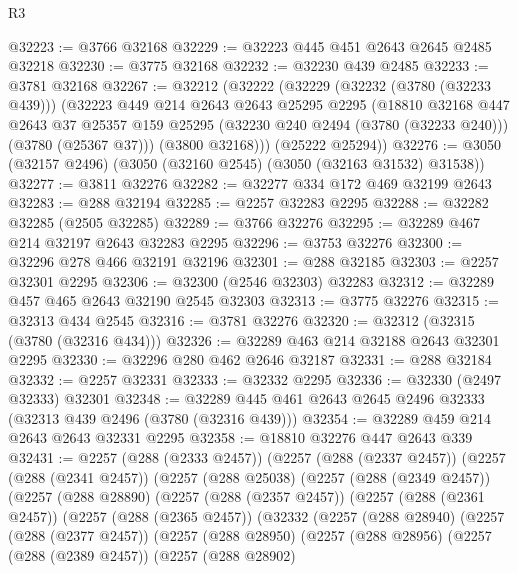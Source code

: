 \begin{lexlean}{R3}
\begin{coremodule}
@32223 := @3766 @32168
@32229 := @32223 @445 @451 @2643 @2645 @2485 @32218
@32230 := @3775 @32168
@32232 := @32230 @439 @2485
@32233 := @3781 @32168
@32267 := @32212
    (@32222
      (@32229
        (@32232 (@3780 (@32233 @439)))
        (@32223
          @449
          @214
          @2643
          @2643
          @25295
          @2295
          (@18810
            @32168
            @447
            @2643
            @37
            @25357
            @159
            @25295
            (@32230 @240 @2494 (@3780 (@32233 @240)))
            (@3780 (@25367 @37)))
          (@3800 @32168)))
      (@25222 @25294))
@32276 := @3050 (@32157 @2496) (@3050 (@32160 @2545) (@3050 (@32163 @31532) @31538))
@32277 := @3811 @32276
@32282 := @32277 @334 @172 @469 @32199 @2643
@32283 := @288 @32194
@32285 := @2257 @32283 @2295
@32288 := @32282 @32285 (@2505 @32285)
@32289 := @3766 @32276
@32295 := @32289 @467 @214 @32197 @2643 @32283 @2295
@32296 := @3753 @32276
@32300 := @32296 @278 @466 @32191 @32196
@32301 := @288 @32185
@32303 := @2257 @32301 @2295
@32306 := @32300 (@2546 @32303) @32283
@32312 := @32289 @457 @465 @2643 @32190 @2545 @32303
@32313 := @3775 @32276
@32315 := @32313 @434 @2545
@32316 := @3781 @32276
@32320 := @32312 (@32315 (@3780 (@32316 @434)))
@32326 := @32289 @463 @214 @32188 @2643 @32301 @2295
@32330 := @32296 @280 @462 @2646 @32187
@32331 := @288 @32184
@32332 := @2257 @32331
@32333 := @32332 @2295
@32336 := @32330 (@2497 @32333) @32301
@32348 := @32289 @445 @461 @2643 @2645 @2496 @32333 (@32313 @439 @2496 (@3780 (@32316 @439)))
@32354 := @32289 @459 @214 @2643 @2643 @32331 @2295
@32358 := @18810 @32276 @447 @2643 @339
@32431 := @2257
    (@288 (@2333 @2457))
    (@2257
      (@288 (@2337 @2457))
      (@2257
        (@288 (@2341 @2457))
        (@2257
          (@288 @25038)
          (@2257
            (@288 (@2349 @2457))
            (@2257
              (@288 @28890)
              (@2257
                (@288 (@2357 @2457))
                (@2257
                  (@288 (@2361 @2457))
                  (@2257
                    (@288 (@2365 @2457))
                    (@32332
                      (@2257
                        (@288 @28940)
                        (@2257
                          (@288 (@2377 @2457))
                          (@2257
                            (@288 @28950)
                            (@2257
                              (@288 @28956)
                              (@2257
                                (@288 (@2389 @2457))
                                (@2257
                                  (@288 @28902)

\end{coremodule}
\end{lexlean}
